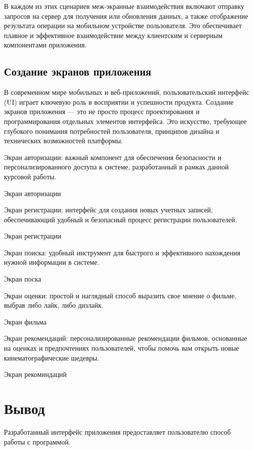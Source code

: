 В каждом из этих сценариев меж-экранные взаимодействия включают отправку запросов на сервер для получения или
обновления данных, а также отображение результата операции на мобильном устройстве пользователя.
Это обеспечивает плавное и эффективное взаимодействие между клиентским и серверным компонентами приложения.

\subsection{Создание экранов приложения}

В современном мире мобильных и веб-приложений, пользовательский интерфейс (UI) играет ключевую роль в восприятии и
успешности продукта.
Создание экранов приложения — это не просто процесс проектирования и программирования отдельных элементов интерфейса.
Это искусство, требующее глубокого понимания потребностей пользователя, принципов дизайна и технических возможностей
платформы.

Экран авторизации: важный компонент для обеспечения безопасности и персонализированного доступа к системе,
разработанный в рамках данной курсовой работы.

\begin{image}
	\caption{Экран авторизации}
	\label{engineering:login}
\end{image}

\clearpage

Экран регистрации: интерфейс для создания новых учетных записей, обеспечивающий удобный и безопасный процесс
регистрации пользователей.

\begin{image}
	\caption{Экран регистрации}
	\label{engineering:signup}
\end{image}
Экран поиска: удобный инструмент для быстрого и эффективного нахождения нужной информации в системе.
\begin{image}
	\caption{Экран поска}
	\label{engineering:find}
\end{image}
\clearpage
Экран оценки: простой и наглядный способ выразить свое мнение о фильме, выбрав либо лайк, либо дизлайк.

\begin{image}
	\caption{Экран фильма}
	\label{engineering:film}
\end{image}

Экран рекомендаций: персонализированные рекомендации фильмов, основанные на оценках и предпочтениях пользователей,
чтобы помочь вам открыть новые кинематографические шедевры.
\begin{image}
	\caption{Экран рекоминдаций}
	\label{engineering:recom}
\end{image}


\section*{\LARGE Вывод}

Разработанный интерфейс приложения предоставляет пользователю способ работы с программой.



